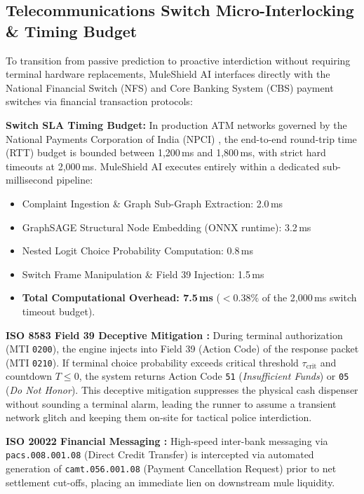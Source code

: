 \documentclass[conference]{IEEEtran}
\begin{document}
\subsection{Telecommunications Switch Micro-Interlocking \& Timing Budget}
To transition from passive prediction to proactive interdiction without requiring terminal hardware replacements, MuleShield AI interfaces directly with the National Financial Switch (NFS) and Core Banking System (CBS) payment switches via financial transaction protocols:

\textbf{Switch SLA Timing Budget:} In production ATM networks governed by the National Payments Corporation of India (NPCI) \cite{npci2023}, the end-to-end round-trip time (RTT) budget is bounded between 1,200\,ms and 1,800\,ms, with strict hard timeouts at 2,000\,ms. MuleShield AI executes entirely within a dedicated sub-millisecond pipeline:
\begin{itemize}
    \item Complaint Ingestion \& Graph Sub-Graph Extraction: 2.0\,ms
    \item GraphSAGE Structural Node Embedding (ONNX runtime): 3.2\,ms
    \item Nested Logit Choice Probability Computation: 0.8\,ms
    \item Switch Frame Manipulation \& Field 39 Injection: 1.5\,ms
    \item \textbf{Total Computational Overhead: 7.5\,ms} ($<0.38\%$ of the 2,000\,ms switch timeout budget).
\end{itemize}

\textbf{ISO 8583 Field 39 Deceptive Mitigation \cite{iso8583}:} During terminal authorization (MTI \texttt{0200}), the engine injects into Field 39 (Action Code) of the response packet (MTI \texttt{0210}). If terminal choice probability exceeds critical threshold $\tau_{\text{crit}}$ and countdown $T \le 0$, the system returns Action Code \texttt{51} (\textit{Insufficient Funds}) or \texttt{05} (\textit{Do Not Honor}). This deceptive mitigation suppresses the physical cash dispenser without sounding a terminal alarm, leading the runner to assume a transient network glitch and keeping them on-site for tactical police interdiction.

\textbf{ISO 20022 Financial Messaging \cite{iso20022}:} High-speed inter-bank messaging via \texttt{pacs.008.001.08} (Direct Credit Transfer) is intercepted via automated generation of \texttt{camt.056.001.08} (Payment Cancellation Request) prior to net settlement cut-offs, placing an immediate lien on downstream mule liquidity.
\end{document}
